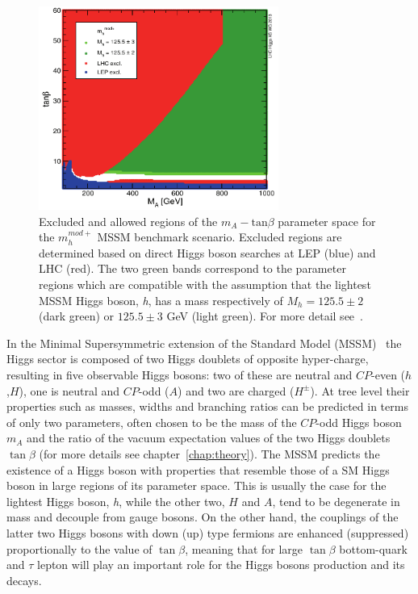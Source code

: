\begin{figure}[tp]
     \begin{center}

            \includegraphics[width=0.7\textwidth]{figure/mh_mod.png}

    \end{center}
    \caption{Excluded and allowed regions of the $m_{A} - \text{tan}\beta$ parameter space for the  $m_{h}^{mod+}$ 
	MSSM benchmark scenario. Excluded regions are determined based on direct Higgs boson searches at LEP 
	(blue) and LHC (red). The two green 
	bands correspond to the parameter regions which are compatible with the assumption that 
	the lightest MSSM Higgs boson, \emph{h}, has a mass respectively of $M_{h} = 125.5 \pm 2$ (dark green) 
	or $125.5 \pm 3$ GeV (light green). For more detail 
	see~\cite{LHCxsec}.}
   \label{fig:mhmod}
\end{figure}

In the Minimal Supersymmetric extension of the Standard Model
(MSSM)~\cite{MSSM1, MSSM2} the Higgs sector is composed of two Higgs
doublets of opposite hyper-charge, resulting in five observable Higgs
bosons:  two of these are neutral and $CP$-even
($h$,$H$), one is neutral and $CP$-odd ($A$) and two are charged
($H^\pm$).  At tree level their properties such as masses, widths and
branching ratios can be predicted in terms of only two parameters,
often chosen to be the mass of the $CP$-odd Higgs boson $m_A$ and
the ratio of the vacuum expectation values of the two Higgs doublets
$\tan\beta$ (for more details see chapter~\ref{chap:theory}).  
The MSSM predicts the existence of a Higgs boson with properties that  
resemble those of a SM Higgs boson in large regions of its parameter space. 
This is usually the case for the lightest Higgs boson, \emph{h}, while the other two, $H$ and $A$, 
tend to be degenerate in mass and decouple from gauge bosons.
On the other hand, the couplings of the latter two Higgs bosons with down (up) type fermions are enhanced
(suppressed) proportionally to the value of $\tan\beta$, meaning that for large $\tan\beta$
bottom-quark and $\tau$ lepton will play an important role for the Higgs bosons production and its decays. 
 
